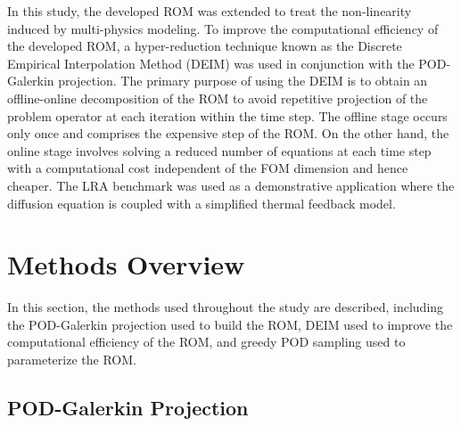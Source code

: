 \documentclass[]{interact}
\theoremstyle{plain}%
\theoremstyle{definition}
\theoremstyle{remark}
\begin{document}
In this study, the developed ROM was extended to treat the non-linearity induced by multi-physics modeling.
To improve the computational efficiency of the developed ROM, a hyper-reduction technique known as the Discrete Empirical Interpolation Method (DEIM) was used in conjunction with the POD-Galerkin projection.
The primary purpose of using the DEIM is to obtain an offline-online decomposition of the ROM to avoid repetitive projection of the problem operator at each iteration within the time step.
The offline stage occurs only once and comprises the expensive step of the ROM.
On the other hand, the online stage involves solving a reduced number of equations at each time step with a computational cost independent of the FOM dimension and hence cheaper.
The LRA benchmark was used as a demonstrative application where the diffusion equation is coupled with a simplified thermal feedback model.


\section{Methods Overview}

In this section, the methods used throughout the study are described, including the POD-Galerkin projection used to build the ROM, DEIM used to improve the computational efficiency of the ROM, and greedy POD sampling used to parameterize the ROM.


\subsection{POD-Galerkin Projection}\label{class}
\end{document}
